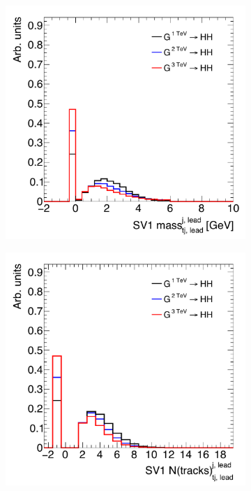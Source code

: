 \begin{figure}[h!]
  \centering
  \captionsetup{justification=centering}

   \begin{subfigure}[t]{0.5\textwidth}
        \centering
        \includegraphics[width=\textwidth]{figures/LeadTrackJet_SV1mass}
        \caption{}
    \end{subfigure}%
    \begin{subfigure}[t]{0.5\textwidth}
        \centering
        \includegraphics[width=\textwidth]{figures/LeadTrackJet_SV1ntrk}
        \caption{}
    \end{subfigure}


\end{figure}
